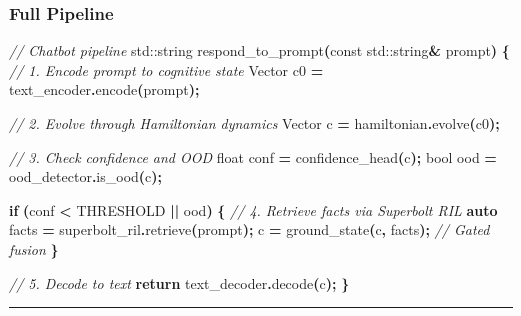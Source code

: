 \documentclass[
  11pt,
  a4paper,
]{article}
\newenvironment{Shaded}{\begin{snugshade}}{\end{snugshade}}
\newcommand{\AttributeTok}[1]{\textcolor[rgb]{0.13,0.29,0.53}{#1}}
\newcommand{\BuiltInTok}[1]{#1}
\newcommand{\CommentTok}[1]{\textcolor[rgb]{0.56,0.35,0.01}{\textit{#1}}}
\newcommand{\ControlFlowTok}[1]{\textcolor[rgb]{0.13,0.29,0.53}{\textbf{#1}}}
\newcommand{\DataTypeTok}[1]{\textcolor[rgb]{0.13,0.29,0.53}{#1}}
\newcommand{\KeywordTok}[1]{\textcolor[rgb]{0.13,0.29,0.53}{\textbf{#1}}}
\newcommand{\NormalTok}[1]{#1}
\newcommand{\OperatorTok}[1]{\textcolor[rgb]{0.81,0.36,0.00}{\textbf{#1}}}
\begin{document}
\subsubsection{Full Pipeline}\label{full-pipeline}

\begin{Shaded}
\begin{Highlighting}[]
\CommentTok{// Chatbot pipeline}
\BuiltInTok{std::}\NormalTok{string respond\_to\_prompt}\OperatorTok{(}\AttributeTok{const} \BuiltInTok{std::}\NormalTok{string}\OperatorTok{\&}\NormalTok{ prompt}\OperatorTok{)} \OperatorTok{\{}
    \CommentTok{// 1. Encode prompt to cognitive state}
\NormalTok{    Vector c0 }\OperatorTok{=}\NormalTok{ text\_encoder}\OperatorTok{.}\NormalTok{encode}\OperatorTok{(}\NormalTok{prompt}\OperatorTok{);}
    
    \CommentTok{// 2. Evolve through Hamiltonian dynamics}
\NormalTok{    Vector c }\OperatorTok{=}\NormalTok{ hamiltonian}\OperatorTok{.}\NormalTok{evolve}\OperatorTok{(}\NormalTok{c0}\OperatorTok{);}
    
    \CommentTok{// 3. Check confidence and OOD}
    \DataTypeTok{float}\NormalTok{ conf }\OperatorTok{=}\NormalTok{ confidence\_head}\OperatorTok{(}\NormalTok{c}\OperatorTok{);}
    \DataTypeTok{bool}\NormalTok{ ood }\OperatorTok{=}\NormalTok{ ood\_detector}\OperatorTok{.}\NormalTok{is\_ood}\OperatorTok{(}\NormalTok{c}\OperatorTok{);}
    
    \ControlFlowTok{if} \OperatorTok{(}\NormalTok{conf }\OperatorTok{\textless{}}\NormalTok{ THRESHOLD }\OperatorTok{||}\NormalTok{ ood}\OperatorTok{)} \OperatorTok{\{}
        \CommentTok{// 4. Retrieve facts via Superbolt RIL}
        \KeywordTok{auto}\NormalTok{ facts }\OperatorTok{=}\NormalTok{ superbolt\_ril}\OperatorTok{.}\NormalTok{retrieve}\OperatorTok{(}\NormalTok{prompt}\OperatorTok{);}
\NormalTok{        c }\OperatorTok{=}\NormalTok{ ground\_state}\OperatorTok{(}\NormalTok{c}\OperatorTok{,}\NormalTok{ facts}\OperatorTok{);}  \CommentTok{// Gated fusion}
    \OperatorTok{\}}
    
    \CommentTok{// 5. Decode to text}
    \ControlFlowTok{return}\NormalTok{ text\_decoder}\OperatorTok{.}\NormalTok{decode}\OperatorTok{(}\NormalTok{c}\OperatorTok{);}
\OperatorTok{\}}
\end{Highlighting}
\end{Shaded}

\begin{center}\rule{0.5\linewidth}{0.5pt}\end{center}
\end{document}
